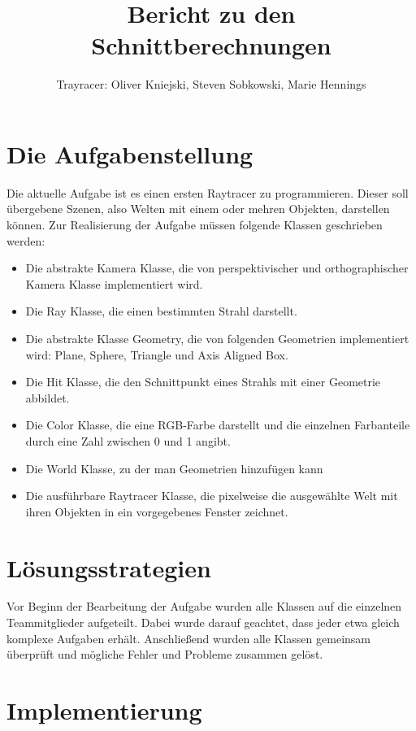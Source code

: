 \documentclass[a4paper,parskip=half,11pt]{scrartcl}
\author{Trayracer: Oliver Kniejski, Steven Sobkowski, Marie Hennings}
\title{Bericht zu den Schnittberechnungen}
\begin{document}
 
\maketitle

\section*{Die Aufgabenstellung}

Die aktuelle Aufgabe ist es einen ersten Raytracer zu programmieren.
Dieser soll übergebene Szenen, also Welten mit einem oder mehren Objekten, darstellen können.
Zur Realisierung der Aufgabe müssen folgende Klassen geschrieben werden:
\begin{itemize}
\item Die abstrakte Kamera Klasse, die von perspektivischer und orthographischer Kamera Klasse implementiert wird. 
\item Die Ray Klasse, die einen bestimmten Strahl darstellt.
\item Die abstrakte Klasse Geometry, die von folgenden Geometrien implementiert wird: Plane, Sphere, Triangle und Axis Aligned Box.
\item Die Hit Klasse, die den Schnittpunkt eines Strahls mit einer Geometrie abbildet.
\item Die Color Klasse, die eine RGB-Farbe darstellt und die einzelnen Farbanteile durch eine Zahl zwischen 0 und 1 angibt.
\item Die World Klasse, zu der man Geometrien hinzufügen kann
\item Die ausführbare Raytracer Klasse, die pixelweise die ausgewählte Welt mit ihren Objekten in ein vorgegebenes Fenster zeichnet.
\end{itemize}

\section*{Lösungsstrategien}

Vor Beginn der Bearbeitung der Aufgabe wurden alle Klassen auf die einzelnen Teammitglieder aufgeteilt.
Dabei wurde darauf geachtet, dass jeder etwa gleich komplexe Aufgaben erhält.
Anschließend wurden alle Klassen gemeinsam überprüft und mögliche Fehler und Probleme zusammen gelöst.

\section*{Implementierung}
\end{document}
